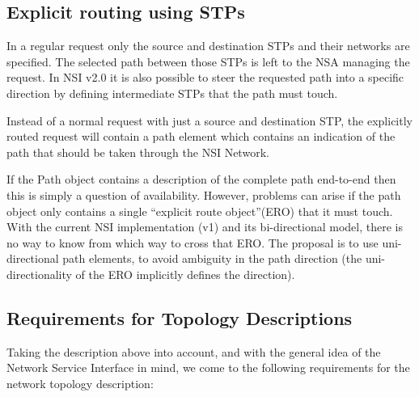 \documentclass[12pt]{article}  %
\begin{document}
\subsection{Explicit routing using STPs}

In a regular request only the source and destination STPs and 
their networks are specified. The selected path between those STPs is left to the 
NSA managing the request. In NSI v2.0 it is also possible to steer the requested 
path into a specific direction by defining intermediate STPs that the path must 
touch.

Instead of a normal request with just a source and destination 
STP, the explicitly routed request will contain a path element which contains an 
indication of the path that should be taken through the NSI Network.

If the Path object contains a description of the complete path 
end-to-end then this is simply a question of availability. However, problems can 
arise if the path object only contains a single ``explicit route object''(ERO) 
that it must touch. With the current NSI implementation (v1) and its bi-directional 
model, there is no way to know from which way to cross that ERO. The proposal is 
to use uni-directional path elements, to avoid ambiguity in the path direction 
(the uni-directionality of the ERO implicitly defines the direction).


\subsection{Requirements for Topology Descriptions}

Taking the description above into account, and with the general 
idea of the Network Service Interface in mind, we come to the following requirements 
for the network topology description:
\end{document}
